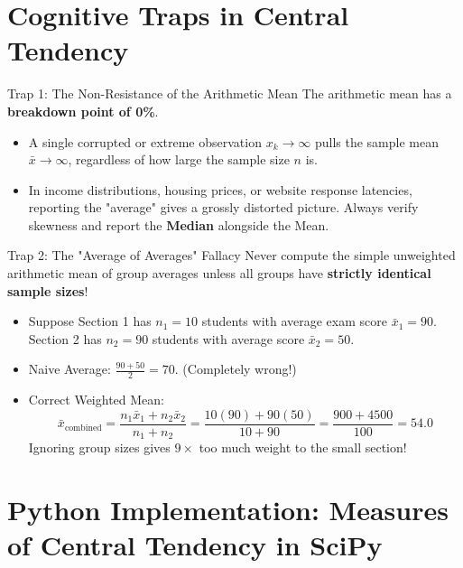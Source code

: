 \section{Cognitive Traps in Central Tendency}

\begin{trapbox}{Trap 1: The Non-Resistance of the Arithmetic Mean}
The arithmetic mean has a \textbf{breakdown point of 0\%}.
\begin{itemize}
    \item A single corrupted or extreme observation $x_k \to \infty$ pulls the sample mean $\bar{x} \to \infty$, regardless of how large the sample size $n$ is.
    \item In income distributions, housing prices, or website response latencies, reporting the "average" gives a grossly distorted picture. Always verify skewness and report the \textbf{Median} alongside the Mean.
\end{itemize}
\end{trapbox}

\begin{trapbox}{Trap 2: The "Average of Averages" Fallacy}
Never compute the simple unweighted arithmetic mean of group averages unless all groups have \textbf{strictly identical sample sizes}!
\begin{itemize}
    \item Suppose Section 1 has $n_1 = 10$ students with average exam score $\bar{x}_1 = 90$. Section 2 has $n_2 = 90$ students with average score $\bar{x}_2 = 50$.
    \item Naive Average: $\frac{90 + 50}{2} = 70$. (Completely wrong!)
    \item Correct Weighted Mean:
    $$\bar{x}_{\text{combined}} = \frac{n_1 \bar{x}_1 + n_2 \bar{x}_2}{n_1 + n_2} = \frac{10(90) + 90(50)}{10 + 90} = \frac{900 + 4500}{100} = \mathbf{54.0}$$
    Ignoring group sizes gives $9 \times$ too much weight to the small section!
\end{itemize}
\end{trapbox}

\section{Python Implementation: Measures of Central Tendency in SciPy}

